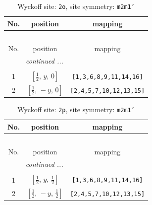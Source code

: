 \documentclass[fleqn,8pt]{jsarticle}
\begin{document}
\begin{longtable}{ccc}
\caption{Wyckoff site: {\tt 2o}, site symmetry: {\tt m2m1'}}
 \\
 \hline \hline
No. & position & mapping \\ \hline \endfirsthead

\multicolumn{2}{l}{\tablename\ \thetable{}} \\
 \hline \hline
No. & position & mapping \\ \hline \endhead

 \hline \hline
\multicolumn{2}{r}{\footnotesize\it continued ...} \\ \endfoot

 \hline \hline
\multicolumn{2}{r}{} \\ \endlastfoot

1 & $\left[ \frac{1}{2},\, y,\, 0 \right]$ & {\tt [1,3,6,8,9,11,14,16]} \\ \hline
2 & $\left[ \frac{1}{2},\, - y,\, 0 \right]$ & {\tt [2,4,5,7,10,12,13,15]} \\
\end{longtable}
\renewcommand{\arraystretch}{1.2}
\begin{longtable}{ccc}
\caption{Wyckoff site: {\tt 2p}, site symmetry: {\tt m2m1'}}
 \\
 \hline \hline
No. & position & mapping \\ \hline \endfirsthead

\multicolumn{2}{l}{\tablename\ \thetable{}} \\
 \hline \hline
No. & position & mapping \\ \hline \endhead

 \hline \hline
\multicolumn{2}{r}{\footnotesize\it continued ...} \\ \endfoot

 \hline \hline
\multicolumn{2}{r}{} \\ \endlastfoot

1 & $\left[ \frac{1}{2},\, y,\, \frac{1}{2} \right]$ & {\tt [1,3,6,8,9,11,14,16]} \\ \hline
2 & $\left[ \frac{1}{2},\, - y,\, \frac{1}{2} \right]$ & {\tt [2,4,5,7,10,12,13,15]} \\
\end{longtable}
\renewcommand{\arraystretch}{1.2}
\end{document}
